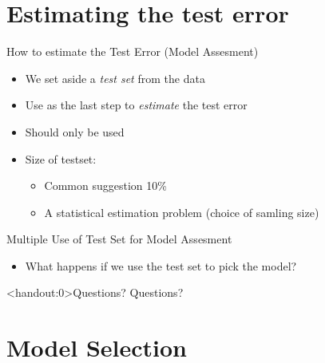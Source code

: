 \documentclass[10pt,handout]{beamer}
\begin{document}
\section{Estimating the test error}

\begin{frame}{How to estimate the Test Error (Model Assesment)}

\begin{itemize}
\item We set aside a \emph{test set} from the data
\item Use as the last step to \emph{estimate} the test error
\item Should only be used \pause
\item Size of testset:
\begin{itemize}
\item Common suggestion 10\%
\item A statistical estimation problem (choice of samling size)
\end{itemize}
\end{itemize}

\end{frame}


\begin{frame}{Multiple Use of Test Set for Model Assesment}

\begin{itemize}
\item What happens if we use the test set to pick the model?
\end{itemize}

\end{frame}

\begin{frame}<handout:0>{Questions?}
Questions?
\end{frame}



\section{Model Selection}
\frame{\sectionpage}
\end{document}
